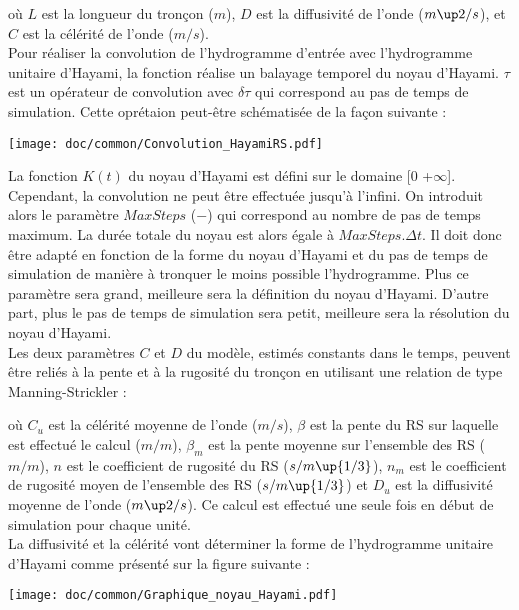 

où $L$ est la longueur du tronçon ($m$), $D$ est la diffusivité de l'onde ($m\up2/s$), et $C$ est la célérité de l'onde ($m/s$).\\

Pour réaliser la convolution de l'hydrogramme d'entrée avec l'hydrogramme unitaire d'Hayami, la fonction réalise un balayage temporel du noyau d'Hayami. $\tau$ est un opérateur de convolution avec $\delta \tau$ qui correspond au pas de temps de simulation. Cette oprétaion peut-être schématisée de la façon suivante :

\texttt{[image: doc/common/Convolution\_HayamiRS.pdf]}

La fonction $K(t)$ du noyau d'Hayami est défini sur le domaine [0 +$\infty$]. Cependant, la convolution ne peut être effectuée jusqu'à l'infini. On introduit alors le paramètre $MaxSteps$ ($-$) qui correspond au nombre de pas de temps maximum. La durée totale du noyau est alors égale à $MaxSteps . \Delta t$. Il doit donc être adapté en fonction de la forme du noyau d'Hayami et du pas de temps de simulation de manière à tronquer le moins possible l'hydrogramme. Plus ce paramètre sera grand, meilleure sera la définition du noyau d'Hayami. D'autre part, plus le pas de temps de simulation sera petit, meilleure sera la résolution du noyau d'Hayami.\\

Les deux paramètres $C$ et $D$ du modèle, estimés constants dans le temps, peuvent être reliés à la pente et à la rugosité du tronçon en utilisant une relation de type Manning-Strickler :



où $C_u$ est la célérité moyenne de l'onde ($m/s$), $\beta$ est la pente du RS sur laquelle est effectué le calcul ($m/m$), $\beta_m$ est la pente moyenne sur l'ensemble des RS ($m/m$), $n$ est le coefficient de rugosité du RS ($s/m\up{1/3}$), $n_m$ est le coefficient de rugosité moyen de l'ensemble des RS ($s/m\up{1/3}$) et $D_u$ est la diffusivité moyenne de l'onde ($m\up2/s$). Ce calcul est effectué une seule fois en début de simulation pour chaque unité.\\

La diffusivité et la célérité vont déterminer la forme de l'hydrogramme unitaire d'Hayami comme présenté sur la figure suivante :


\texttt{[image: doc/common/Graphique\_noyau\_Hayami.pdf]}


